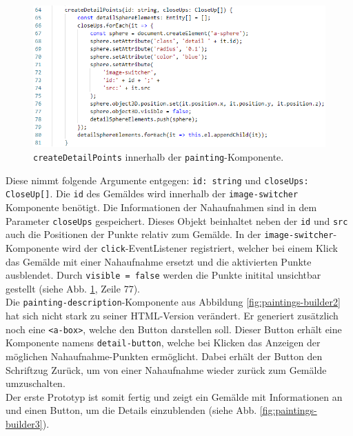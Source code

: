 \documentclass[a4paper,12pt,oneside]{article}
\begin{document}
        \begin{figure}
          \centering
          \includegraphics{img/coding/painting1.png}
          \caption{\texttt{createDetailPoints} innerhalb der \texttt{painting}-Komponente.}
          \label{fig:painting1}
        \end{figure}
        Diese nimmt folgende Argumente entgegen: \texttt{id: string} und
        \texttt{closeUps: CloseUp[]}. Die \texttt{id} des Gemäldes wird
        innerhalb der \texttt{image-switcher} Komponente benötigt. Die
        Informationen der Nahaufnahmen sind in dem Parameter 
        \texttt{closeUps} gespeichert. Dieses Objekt beinhaltet neben
        der \texttt{id} und \texttt{src} auch die Positionen der Punkte
        relativ zum Gemälde. In der \texttt{image-switcher}-Komponente
        wird der \texttt{click}-EventListener registriert, welcher bei
        einem Klick das Gemälde mit einer Nahaufnahme ersetzt und die 
        aktivierten Punkte ausblendet. Durch
        \texttt{visible = false} werden die Punkte initital unsichtbar gestellt
        (siehe Abb. \ref{fig:painting1}, Zeile 77). \\
        Die \texttt{painting-description}-Komponente aus Abbildung 
        \ref{fig:paintings-builder2} hat sich nicht stark
        zu seiner HTML-Version verändert. Er generiert zusätzlich noch
        eine \texttt{<a-box>}, welche den Button darstellen soll. Dieser
        Button erhält eine Komponente namens \texttt{detail-button}, welche
        bei Klicken das Anzeigen der möglichen Nahaufnahme-Punkten
        ermöglicht. Dabei erhält der Button den Schriftzug \glqq Zurück\grqq{}, 
        um von einer Nahaufnahme wieder zurück zum Gemälde umzuschalten. \\
        Der erste Prototyp ist somit fertig und zeigt ein Gemälde mit 
        Informationen an und einen Button, um die Details einzublenden
        (siehe Abb. \ref{fig:paintings-builder3}).
\end{document}
